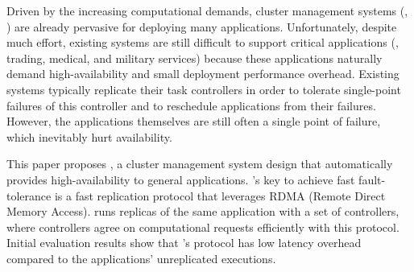 
Driven by the increasing computational demands, cluster management systems 
(\eg, \mesos) are already pervasive for deploying many applications. 
Unfortunately, despite much effort, existing systems are still difficult to 
support critical applications (\eg, trading, medical, and military services) 
because these applications naturally demand high-availability and small 
deployment performance overhead. Existing systems typically replicate their 
task controllers in order to tolerate single-point 
failures of this controller and to reschedule applications from their failures. 
However, the applications themselves are still often a single point of failure, 
which inevitably hurt availability.


This paper proposes \xxx, a cluster management system design that automatically 
provides high-availability to general applications. \xxx's key to achieve fast 
fault-tolerance is a fast \paxos replication protocol that leverages RDMA 
(Remote Direct Memory Access). \xxx runs replicas of the same application with 
a set of controllers, where controllers agree on computational requests 
efficiently with this protocol. Initial evaluation results show that \xxx's 
protocol has low latency overhead compared to the applications' unreplicated 
executions.


